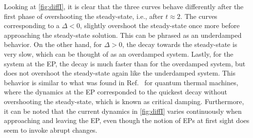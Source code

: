 \documentclass[../main.tex]{subfiles}
\begin{document}
Looking at \cref{fig:diffI}, it is clear that the three curves behave differently after the first phase of overshooting the steady-state, i.e., after $t\approx 2$. The curves corresponding to a $\Delta<0$, slightly overshoot the steady-state once more before approaching the steady-state solution. This can be phrased as an underdamped behavior. On the other hand, for $\Delta>0$, the decay towards the steady-state is very slow, which can be thought of as an overdamped system. Lastly, for the system at the EP, the decay is much faster than for the overdamped system, but does not overshoot the steady-state again like the underdamped system. This behavior is similar to what was found in Ref.~\cite{thermal} for quantum thermal machines, where the dynamics at the EP corresponded to the quickest decay without overshooting the steady-state, which is known as critical damping. Furthermore, it can be noted that the current dynamics in \cref{fig:diffI} varies continuously when approaching and leaving the EP, even though the notion of EPs at first sight does seem to invoke abrupt changes.
\end{document}
